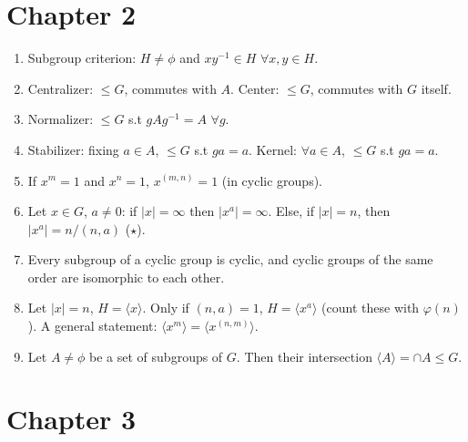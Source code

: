 \documentclass{article}
\begin{document}
\section*{Chapter 2}

\begin{enumerate}[1.]
    \item Subgroup criterion: $H \not= \phi$ and $xy^{-1} \in H$ $\forall x,y
        \in H$.
    \item Centralizer: $\leq G$, commutes with $A$. Center: $\leq G$,
        commutes with $G$ itself. 
    \item Normalizer: $\leq G$ s.t $gAg^{-1} = A$ $\forall g$.
    \item Stabilizer: fixing $a \in A$, $\leq G$ s.t $ga = a$. Kernel: 
        $\forall a \in A$, $\leq G$ s.t $ga = a$.
    \item If $x^m = 1$ and $x^n = 1$, $x^{(m, n)} = 1$ (in cyclic groups).
    \item Let $x \in G$, $a \not= 0$: if $|x| = \infty$ then $|x^a| =
        \infty$. Else, if $|x| = n$, then $|x^a| = n/(n, a)$ ($\star$).
    \item Every subgroup of a cyclic group is cyclic, and cyclic groups of
        the same order are isomorphic to each other.
    \item Let $|x| = n$, $H = \langle x \rangle$. Only if $(n, a) = 1$, $H =
        \langle x^a \rangle$ (count these with $\varphi(n)$). 
        A general statement: $\langle x^m \rangle = \langle x^{(n, m)}
        \rangle$.
    \item Let $A \not= \phi$ be a set of subgroups of $G$. Then their
        intersection $\langle A \rangle = \cap A \leq G$.
\end{enumerate}

\section*{Chapter 3}
\end{document}
